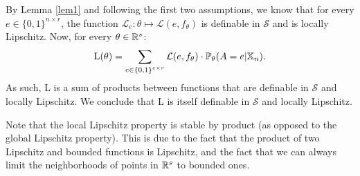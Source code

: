 By Lemma \ref{lem1} and following the first two assumptions, we know that for every $e\in{\{0,1\}}^{n\times r}$, the function $\mathcal{L}_e\colon\theta\mapsto \mathcal{L}(e,f_\theta)$ is definable in $\mathcal{S}$ and is locally Lipschitz. Now, for every $\theta\in\mathbb{R}^s$:
$$\text{L}(\theta)=\sum_{e\in {\{0,1\}}^{e\times r}}\mathcal{L}(e,f_\theta)\cdot\mathbb{P}_\theta(A=e | \mathbb{X}_n).$$
As such, L is a sum of products between functions that are definable in $\mathcal{S}$ and locally Lipschitz. We conclude that L is itself definable in $\mathcal{S}$ and locally Lipschitz.

Note that the local Lipschitz property is stable by product (as opposed to the global Lipschitz property). This is due to the fact that the product of two Lipschitz and bounded functions is Lipschitz, and the fact that we can always limit the neighborhoods of points in $\mathbb{R}^s$ to bounded ones.
